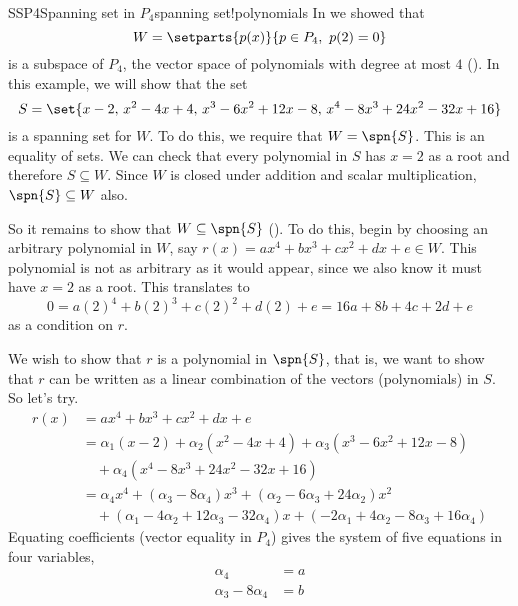 \begin{example}{SSP4}{Spanning set in $P_4$}{spanning set!polynomials}
In  we showed that
%
\begin{equation*}
W=\setparts{p(x)}{p\in P_4,\ p(2)=0}
\end{equation*}
%
is a subspace of $P_4$, the vector space of polynomials with degree at most $4$ ().  In this example, we will show that the set
%
\begin{equation*}
S=\set{x-2,\,x^2-4x+4,\,x^3-6x^2+12x-8,\,x^4-8x^3+24x^2-32x+16}
\end{equation*}
%
is a spanning set for $W$.  To do this, we require that $W=\spn{S}$.  This is an equality of sets.  We can check that every polynomial in $S$ has $x=2$ as a root and therefore $S\subseteq W$.  Since $W$ is closed under addition and scalar multiplication, $\spn{S}\subseteq W$ also.\par
%
So it remains to show that $W\subseteq \spn{S}$ ().  To do this, begin by choosing an arbitrary polynomial in $W$, say $r(x)=ax^4+bx^3+cx^2+dx+e\in W$.  This polynomial is not as arbitrary as it would appear, since we also know it must have $x=2$ as a root.  This translates to
%
\begin{equation*}
0=a(2)^4+b(2)^3+c(2)^2+d(2)+e=16a+8b+4c+2d+e
\end{equation*}
%
as a condition on $r$.\par
%
We wish to show that $r$ is a polynomial in $\spn{S}$, that is, we want to show that $r$ can be written as a linear combination of the vectors (polynomials) in $S$.  So let's try.
%
\begin{align*}
r(x)&=ax^4+bx^3+cx^2+dx+e\\
&=\alpha_1\left(x-2\right)+\alpha_2\left(x^2-4x+4\right)+\alpha_3\left(x^3-6x^2+12x-8\right)\\
&\quad +\alpha_4\left(x^4-8x^3+24x^2-32x+16\right)\\
%
&=\alpha_4x^4+
\left(\alpha_3-8\alpha_4\right)x^3+
\left(\alpha_2-6\alpha_3+24\alpha_2\right)x^2\\
&\quad +
\left(\alpha_1-4\alpha_2+12\alpha_3-32\alpha_4\right)x+
\left(-2\alpha_1+4\alpha_2-8\alpha_3+16\alpha_4\right)
\end{align*}
%
Equating coefficients (vector equality in $P_4$) gives the system of five equations in four variables,
%
\begin{align*}
\alpha_4&=a\\
\alpha_3-8\alpha_4&=b\\

\end{align*}
\end{example}
